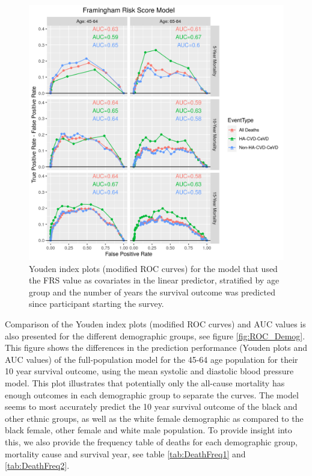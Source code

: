 \documentclass[
]{article}
\begin{document}
\begin{figure}
\centering
\includegraphics{./Rmarkdown_Plots/ROC_FRSModel_CAx-EventType.png}
\caption{Youden index plots (modified ROC curves) for the model that used the FRS value as covariates in the linear predictor, stratified by age group and the number of years the survival outcome was predicted since participant starting the survey.}\label{fig:ROC_FRS}
\end{figure}

Comparison of the Youden index plots (modified ROC curves) and AUC values is also presented for the different demographic groups, see figure \ref{fig:ROC_Demog}. This figure shows the differences in the prediction performance (Youden plots and AUC values) of the full-population model for the 45-64 age population for their 10 year survival outcome, using the mean systolic and diastolic blood pressure model. This plot illustrates that potentially only the all-cause mortality has enough outcomes in each demographic group to separate the curves. The model seems to most accurately predict the 10 year survival outcome of the black and other ethnic groups, as well as the white female demographic as compared to the black female, other female and white male population. To provide insight into this, we also provide the frequency table of deaths for each demographic group, mortality cause and survival year, see table \ref{tab:DeathFreq1} and \ref{tab:DeathFreq2}.
\end{document}
